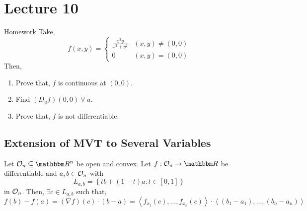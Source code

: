 \documentclass[../Analysis-3]{subfiles}
\begin{document}
\chapter*{Lecture 10} %
\setcounter{chapter}{10} %


\begin{Eg}{Homework}{}
    Take, \[ f(x,y) = \begin{cases}
            \frac{x^{3}y}{x^2 + y^2} & (x,y) \neq (0,0) \\
            0                        & (x,y) = (0,0)
        \end{cases}\]
    Then,
    \begin{enumerate}
        \item Prove that, $f$ is continuous at $(0,0)$.
        \item Find $(D_{u}f)(0,0)\ \forall\ u$.
        \item Prove that, $f$ is not differentiable.
    \end{enumerate}
\end{Eg}

\section{Extension of MVT to Several Variables}

\begin{Thm}{}{}
    Let $ \Op{n} \subseteq \R^n $ be open and convex. Let $f : \Op{n} \to \R$ be differentiable and $a,b \in \mathcal{O}_{n}$ with \[L_{a,b} = \left\{ tb + (1-t)a : t \in [0,1]\right\} \] in $\mathcal{O}_{n}$. Then, $\exists c \in L_{a,b}$ such that, \[ f(b) - f(a) = (\nabla f)(c)\cdot (b-a) = \left\langle f_{x_1}(c), \ldots, f_{x_n}(c) \right\rangle\cdot\left\langle (b_1 - a_1), \ldots, (b_n - a_n) \right\rangle  \]
\end{Thm}
\end{document}
